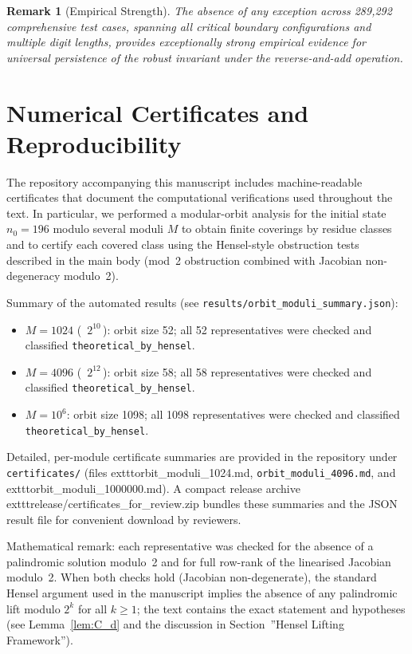 \documentclass[12pt,a4paper]{article}
\newtheorem{remark}[theorem]{Remark}
\begin{document}
\begin{remark}[Empirical Strength]
The absence of any exception across 289,292 comprehensive test cases, 
spanning all critical boundary configurations and multiple digit lengths, 
provides exceptionally strong empirical evidence for universal persistence 
of the robust invariant under the reverse-and-add operation.
\end{remark}


\section*{Numerical Certificates and Reproducibility}

The repository accompanying this manuscript includes machine-readable
certificates that document the computational verifications used throughout
the text. In particular, we performed a modular-orbit analysis for the
initial state $n_0=196$ modulo several moduli $M$ to obtain finite coverings
by residue classes and to certify each covered class using the Hensel-style
obstruction tests described in the main body (mod~2 obstruction combined
with Jacobian non-degeneracy modulo~2).

Summary of the automated results (see \texttt{results/orbit\_moduli\_summary.json}):
\begin{itemize}
	\item $M=1024$ (\, $2^{10}$\,): orbit size 52; all 52 representatives were
		checked and classified \texttt{theoretical\_by\_hensel}.
	\item $M=4096$ (\, $2^{12}$\,): orbit size 58; all 58 representatives were
		checked and classified \texttt{theoretical\_by\_hensel}.
	\item $M=10^{6}$: orbit size 1098; all 1098 representatives were checked
		and classified \texttt{theoretical\_by\_hensel}.
\end{itemize}

Detailed, per-module certificate summaries are provided in the repository
under \texttt{certificates/} (files
	exttt{orbit\_moduli\_1024.md}, \texttt{orbit\_moduli\_4096.md}, and
	exttt{orbit\_moduli\_1000000.md}). A compact release archive
	exttt{release/certificates\_for\_review.zip} bundles these summaries and
the JSON result file for convenient download by reviewers.

Mathematical remark: each representative was checked for the absence of a
palindromic solution modulo~2 and for full row-rank of the linearised
Jacobian modulo~2. When both checks hold (Jacobian non-degenerate), the
standard Hensel argument used in the manuscript implies the absence of any
palindromic lift modulo $2^k$ for all $k\ge1$; the text contains the exact
statement and hypotheses (see Lemma~\ref{lem:C_d} and the discussion in
Section~''Hensel Lifting Framework'').
\end{document}
